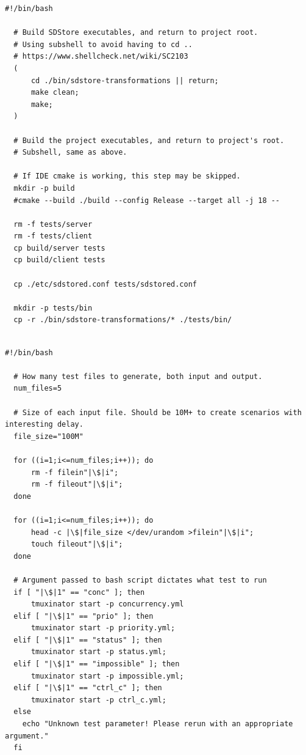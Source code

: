 \documentclass[11pt,a4paper]{report}%
\begin{document}

\label{code:compile_sh}
\begin{lstlisting}[caption={Script Bash de compilação}]
  #!/bin/bash

  # Build SDStore executables, and return to project root.
  # Using subshell to avoid having to cd ..
  # https://www.shellcheck.net/wiki/SC2103
  (
      cd ./bin/sdstore-transformations || return;
      make clean;
      make;
  )
  
  # Build the project executables, and return to project's root.
  # Subshell, same as above.
  
  # If IDE cmake is working, this step may be skipped.
  mkdir -p build
  #cmake --build ./build --config Release --target all -j 18 --
  
  rm -f tests/server
  rm -f tests/client
  cp build/server tests
  cp build/client tests
  
  cp ./etc/sdstored.conf tests/sdstored.conf
  
  mkdir -p tests/bin
  cp -r ./bin/sdstore-transformations/* ./tests/bin/
  
\end{lstlisting}

\label{code:test_sh}
\begin{lstlisting}[caption={Script Bash de teste}]
  #!/bin/bash

  # How many test files to generate, both input and output.
  num_files=5
  
  # Size of each input file. Should be 10M+ to create scenarios with interesting delay.
  file_size="100M"
  
  for ((i=1;i<=num_files;i++)); do
      rm -f filein"|\$|i";
      rm -f fileout"|\$|i";
  done
  
  for ((i=1;i<=num_files;i++)); do
      head -c |\$|file_size </dev/urandom >filein"|\$|i";
      touch fileout"|\$|i";
  done
  
  # Argument passed to bash script dictates what test to run
  if [ "|\$|1" == "conc" ]; then
      tmuxinator start -p concurrency.yml
  elif [ "|\$|1" == "prio" ]; then
      tmuxinator start -p priority.yml;
  elif [ "|\$|1" == "status" ]; then
      tmuxinator start -p status.yml;
  elif [ "|\$|1" == "impossible" ]; then
      tmuxinator start -p impossible.yml;
  elif [ "|\$|1" == "ctrl_c" ]; then
      tmuxinator start -p ctrl_c.yml;
  else
    echo "Unknown test parameter! Please rerun with an appropriate argument."
  fi
\end{lstlisting}
\end{document}
